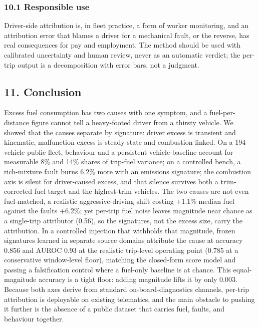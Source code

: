 \subsubsection{10.1 Responsible use}\label{responsible-use}

Driver-side attribution is, in fleet practice, a form of worker
monitoring, and an attribution error that blames a driver for a
mechanical fault, or the reverse, has real consequences for pay and
employment. The method should be used with calibrated uncertainty and
human review, never as an automatic verdict; the per-trip output is a
decomposition with error bars, not a judgment.

\subsection{11. Conclusion}\label{conclusion}

Excess fuel consumption has two causes with one symptom, and a
fuel-per-distance figure cannot tell a heavy-footed driver from a
thirsty vehicle. We showed that the causes separate by signature: driver
excess is transient and kinematic, malfunction excess is steady-state
and combustion-linked. On a 194-vehicle public fleet, behaviour and a
persistent vehicle-baseline account for measurable 8\% and 14\% shares
of trip-fuel variance; on a controlled bench, a rich-mixture fault burns
6.2\% more with an emissions signature; the combustion axis is silent
for driver-caused excess, and that silence survives both a
trim-corrected fuel target and the highest-trim vehicles. The two causes
are not even fuel-matched, a realistic aggressive-driving shift costing
+1.1\% median fuel against the fault\textquotesingle s +6.2\%; yet
per-trip fuel noise leaves magnitude near chance as a single-trip
attributor (0.56), so the signatures, not the excess size, carry the
attribution. In a controlled injection that withholds that magnitude,
frozen signatures learned in separate source domains attribute the cause
at accuracy 0.856 and AUROC 0.93 at the realistic trip-level operating
point (0.785 at a conservative window-level floor), matching the
closed-form score model and passing a falsification control where a
fuel-only baseline is at chance. This equal-magnitude accuracy is a
tight floor: adding magnitude lifts it by only 0.003. Because both axes
derive from standard on-board-diagnostics channels, per-trip attribution
is deployable on existing telematics, and the main obstacle to pushing
it further is the absence of a public dataset that carries fuel, faults,
and behaviour together.

